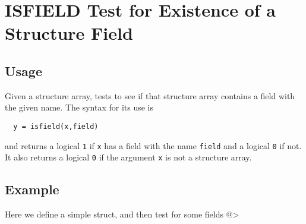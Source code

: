 \section{ISFIELD Test for Existence of a Structure Field}

\subsection{Usage}

Given a structure array, tests to see if that structure
array contains a field with the given name.  The syntax
for its use is
\begin{verbatim}
  y = isfield(x,field)
\end{verbatim}
and returns a logical \verb|1| if \verb|x| has a field with the 
name \verb|field| and a logical \verb|0| if not.  It also returns
a logical \verb|0| if the argument \verb|x| is not a structure array.
\subsection{Example}

Here we define a simple struct, and then test for some 
fields
@>
